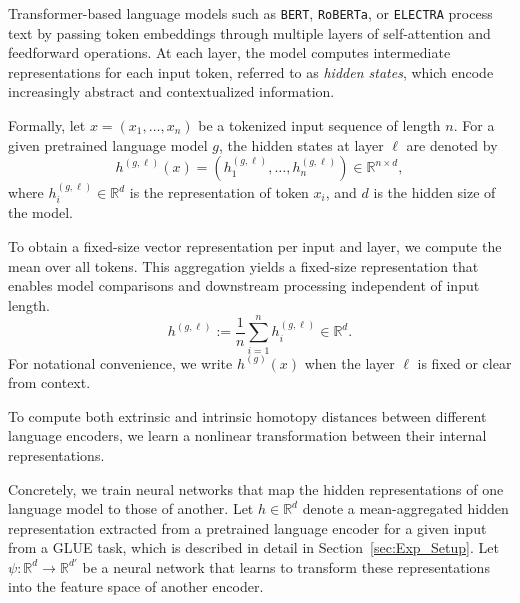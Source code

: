 Transformer-based language models such as \texttt{BERT}, \texttt{RoBERTa}, or \texttt{ELECTRA} process text by passing token embeddings through multiple layers of self-attention and feedforward operations.  
At each layer, the model computes intermediate representations for each input token, referred to as \emph{hidden states}, which encode increasingly abstract and contextualized information.

Formally, let \( x = (x_1, \dots, x_n) \) be a tokenized input sequence of length \( n \).  
For a given pretrained language model \( g \), the hidden states at layer \( \ell \) are denoted by
\[
h^{(g,\ell)}(x) = \left(h^{(g,\ell)}_1, \dots, h^{(g,\ell)}_n\right) \in \mathbb{R}^{n \times d},
\]
where \( h^{(g,\ell)}_i \in \mathbb{R}^d \) is the representation of token \( x_i \), and \( d \) is the hidden size of the model.

To obtain a fixed-size vector representation per input and layer, we compute the mean over all tokens.
This aggregation yields a fixed-size representation that enables model comparisons and downstream processing independent of input length.
\[
h^{(g,\ell)} := \frac{1}{n} \sum_{i=1}^n h_i^{(g,\ell)} \in \mathbb{R}^d.
\]
For notational convenience, we write \( h^{(g)}(x) \) when the layer \( \ell \) is fixed or clear from context.

To compute both extrinsic and intrinsic homotopy distances between different language encoders, we learn a nonlinear transformation between their internal representations.

Concretely, we train neural networks that map the hidden representations of one language model to those of another.
Let \( h \in \mathbb{R}^{d} \) denote a mean-aggregated hidden representation extracted from a pretrained language encoder for a given input from a \ac{GLUE} task, which is described in detail in Section~\ref{sec:Exp_Setup}.
Let \( \psi: \mathbb{R}^{d} \rightarrow \mathbb{R}^{d'} \) be a neural network that learns to transform these representations into the feature space of another encoder.

